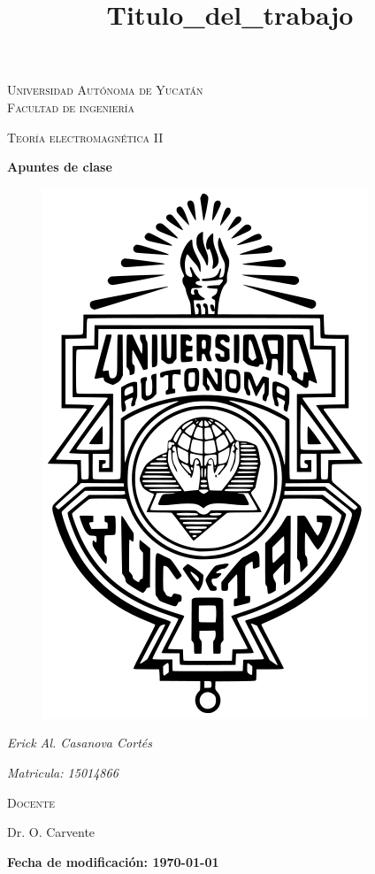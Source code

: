 \documentclass[11pt]{report}
\theoremstyle{plain}
\theoremstyle{definition}
\begin{document}
\begin{titlepage}
\title{Titulo_del_trabajo}


	\centering
	{\scshape\LARGE Universidad Autónoma de Yucatán  \\ Facultad de ingeniería\par}
	\vspace{1cm}
	{\scshape\Large Teoría electromagnética II\par}
	\vspace{1.5cm}
	{\huge\bfseries Apuntes de clase\par}
	\vspace{0.7cm}
	{\begin{figure}[!h]
	\centering
    \includegraphics[scale=0.3]{UADY.png}
	\end{figure}}
	\vspace{0.7cm}
	{\Large\itshape Erick Al. Casanova Cortés\par}
	{\Large\itshape Matricula: 15014866\par}
	\vfill
	{\scshape\Large Docente\par
	Dr. O. Carvente\par}
	\vfill
	{\Large{\bfseries Fecha de modificación: \today} }

	\vfill
	
\end{titlepage}
\end{document}
